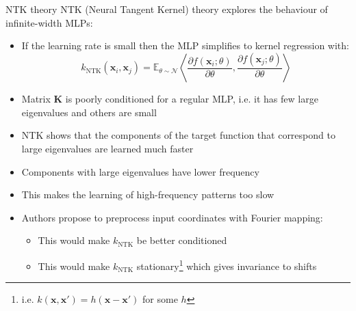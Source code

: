 \documentclass[handout, 10pt]{beamer}
\begin{document}
\begin{frame}{NTK theory}
NTK (Neural Tangent Kernel) theory explores the behaviour of infinite-width MLPs:
\begin{itemize}
    \item\pause If the learning rate is small then the MLP simplifies to kernel regression with:
\begin{equation*}
k_{\mathrm{NTK}}\left(\mathbf{x}_{i}, \mathbf{x}_{j}\right)=\mathbb{E}_{\theta \sim \mathcal{N}}\left\langle\frac{\partial f\left(\mathbf{x}_{i} ; \theta\right)}{\partial \theta}, \frac{\partial f\left(\mathbf{x}_{j} ; \theta\right)}{\partial \theta}\right\rangle
\end{equation*}
    \item\pause Matrix $\bm K$ is poorly conditioned for a regular MLP, i.e. it has few large eigenvalues and others are small
    \item\pause NTK shows that the components of the target function that correspond to large eigenvalues are learned much faster
    \item\pause Components with large eigenvalues have lower frequency
    \item\pause This makes the learning of high-frequency patterns too slow
    \item\pause Authors propose to preprocess input coordinates with Fourier mapping:
    \begin{itemize}
        \item\pause This would make $k_\text{NTK}$ be better conditioned
        \item\pause This would make $k_\text{NTK}$ stationary\footnote{i.e. $k(\bm x, \bm x') = h(\bm x - \bm x')$ for some $h$} which gives invariance to shifts
    \end{itemize}
\end{itemize}
\end{frame}
\end{document}
